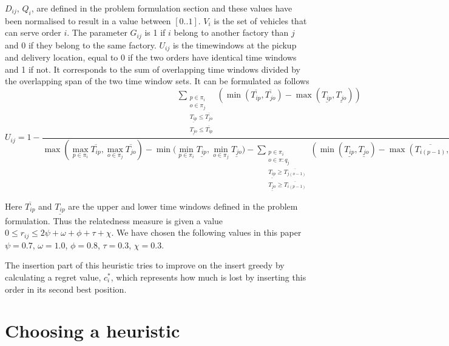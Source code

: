 \documentclass[../main.tex]{subfiles}
\begin{document}
$D_{ij}$, $Q_i$, are defined in the problem formulation section and these values have been normalised to result in a value between $[0..1]$. 
$V_i$ is the set of vehicles that can serve order $i$. 
The parameter $G_{ij}$ is 1 if $i$ belong to another factory than $j$ and 0 if they belong to the same factory. 
$U_{ij}$ is the timewindows at the pickup and delivery location, equal to 0 if the two orders have identical time windows and 1 if not. It corresponds to the sum of overlapping time windows divided by the overlapping span of the two time window sets.
It can be formulated as follows
\begin{equation}
    \label{overlaptime}
    U_{ij} = 1 - 
\dfrac{ 
    \sum\limits_{\substack{p\in \pi_i\\ o\in \pi_j\\ \underline{T_{ip}}\leq \overline{T_{jo}}\\ \underline{T_{jo}}\leq\overline{T_{ip}}}} 
    (\min(\overline{T_{ip}}, \overline{T_{jo}}) - \max(\underline{T_{ip}},\underline{T_{jo}}) )
    }
    {\max{(\max\limits_{p\in \pi_i} \overline{T_{ip}}, \max\limits_{o\in \pi_j} \overline{T_{jo}})} - 
    \min{(\min\limits_{p\in \pi_i} \underline{T_{ip}}, \min\limits_{o\in \pi_j} \underline{T_{jo}}}) -     
    \sum\limits_{\substack{p\in \pi_i\\ o\in \pi:q_j\\ \underline{T_{ip}}\geq \overline{T_{j(o-1)}}\\ \underline{T_{jo}}\geq\overline{T_{i(p-1)}}}} 
    (\min(\underline{T_{ip}}, \underline{T_{jo}}) - \max(\overline{T_{i(p-1)}},\overline{T_{j(o-1)}}) ) 
    }
\end{equation}

Here $\overline{T_{ip}}$ and $\underline{T_{ip}}$ are the upper and lower time windows defined in the problem formulation.
Thus the relatedness measure is given a value $0\leq r_{ij} \leq 2\psi + \omega + \phi + \tau  + \chi$. 
We have chosen the following values in this paper $\psi=0.7$, $\omega=1.0$, $\phi=0.8$, $\tau=0.3$, $\chi = 0.3$. \newline\par
The insertion part of this heuristic tries to improve on the insert greedy by calculating a regret value, $c^*_i$, which represents how much is lost by inserting this order in its second best position.

\section{Choosing a heuristic}
\label{sec:choos}
\end{document}
